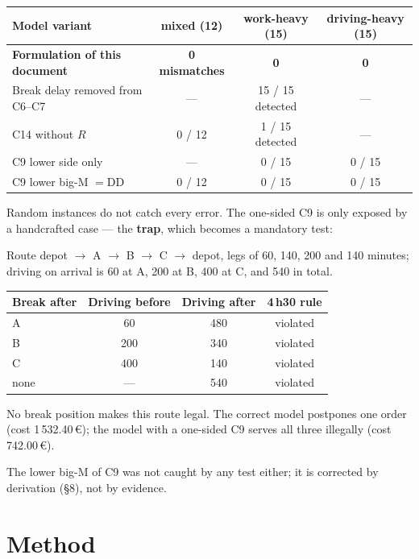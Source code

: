 \documentclass[11pt,a4paper]{article}
\newcommand{\DD}{\mathrm{DD}}\newcommand{\DS}{\mathrm{DS}}\newcommand{\WD}{\mathrm{WD}}
\begin{document}
\begin{center}\small
\begin{tabular}{@{}lccc@{}}
\toprule
\textbf{Model variant} & \textbf{mixed (12)} & \textbf{work-heavy (15)} & \textbf{driving-heavy (15)} \\
\midrule
\textbf{Formulation of this document} & \textbf{0 mismatches} & \textbf{0} & \textbf{0} \\
Break delay removed from C6--C7 & --- & 15 / 15 detected & --- \\
C14 without $R$ & 0 / 12 & 1 / 15 detected & --- \\
C9 lower side only & --- & 0 / 15 & 0 / 15 \\
C9 lower big-M $= \DD$ & 0 / 12 & 0 / 15 & 0 / 15 \\
\bottomrule
\end{tabular}
\end{center}

Random instances do not catch every error. The one-sided C9 is only exposed by a handcrafted case --- the \textbf{trap}, which becomes a mandatory test:

Route depot $\to$ A $\to$ B $\to$ C $\to$ depot, legs of 60, 140, 200 and 140 minutes; driving on arrival is 60 at A, 200 at B, 400 at C, and 540 in total.

\begin{center}\small
\begin{tabular}{@{}lccc@{}}
\toprule
\textbf{Break after} & \textbf{Driving before} & \textbf{Driving after} & \textbf{4\,h30 rule} \\
\midrule
A & 60 & 480 & violated \\
B & 200 & 340 & violated \\
C & 400 & 140 & violated \\
none & --- & 540 & violated \\
\bottomrule
\end{tabular}
\end{center}

No break position makes this route legal. The correct model postpones one order (cost 1\,532.40\,€); the model with a one-sided C9 serves all three illegally (cost 742.00\,€).

The lower big-M of C9 was not caught by any test either; it is corrected by derivation (§8), not by evidence.

\section{Method}
\end{document}
